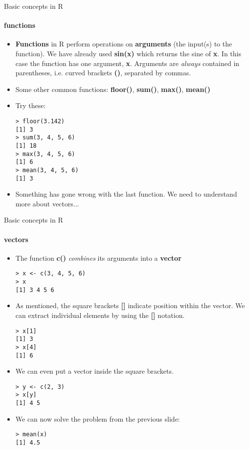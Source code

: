 \documentclass{beamer}
\begin{document}
\begin{frame}{Basic concepts in R}
    \framesubtitle{functions}
    \begin{itemize}
        \item \textbf{Functions} in R perform operations on \textbf{arguments} (the input(s) to the function). We have already used \textbf{sin(x)} which returns the sine of \textbf{x}. In this case the function has one argument, \textbf{x}. Arguments are \emph{always} contained in parentheses, i.e. curved brackets \textbf{()}, separated by commas.
        \item Some other common functions: \textbf{floor()}, \textbf{sum()}, \textbf{max()}, \textbf{mean()}
        \item Try these:
        \begin{verbatim}
> floor(3.142)
[1] 3
> sum(3, 4, 5, 6)
[1] 18
> max(3, 4, 5, 6)
[1] 6
> mean(3, 4, 5, 6)
[1] 3\end{verbatim}
        \item Something has gone wrong with the last function. We need to understand more about vectors...
    \end{itemize}
\end{frame}

\begin{frame}{Basic concepts in R}
    \framesubtitle{vectors}
    \begin{itemize}
        \item The function \textbf{c()} \emph{combines} its arguments into a \textbf{vector}
        \begin{verbatim}
> x <- c(3, 4, 5, 6)
> x
[1] 3 4 5 6\end{verbatim}
        \item As mentioned, the square brackets \textbf{[]} indicate position within the vector. We can extract individual elements by using the \textbf{[]} notation.
        \begin{verbatim}
> x[1]
[1] 3
> x[4]
[1] 6
        \end{verbatim}
        \item We can even put a vector inside the square brackets.
        \begin{verbatim}
> y <- c(2, 3)
> x[y]
[1] 4 5\end{verbatim}
        \item We can now solve the problem from the previous slide:
        \begin{verbatim}
> mean(x)
[1] 4.5\end{verbatim}
    \end{itemize}
\end{frame}
\end{document}
